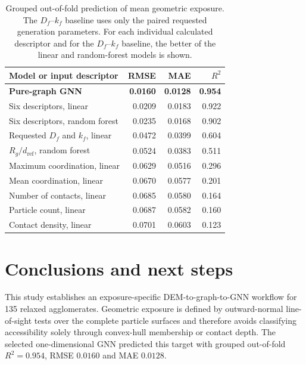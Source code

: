 \documentclass[12pt,a4paper]{article}
\begin{document}
\begin{table}[!tbp]
	\centering
	\caption{Grouped out-of-fold prediction of mean geometric exposure. The
		$D_f$--$k_f$ baseline uses only the paired requested generation parameters.
		For each individual calculated descriptor and for the $D_f$--$k_f$
		baseline, the better of the linear and random-forest models is shown.}
	\label{tab:descriptor_baseline}
	\begin{tabular}{lrrr}
		\toprule
		Model or input descriptor & RMSE & MAE & $R^2$ \\
		\midrule
		\textbf{Pure-graph GNN}
		& \textbf{0.0160} & \textbf{0.0128} & \textbf{0.954} \\
		Six descriptors, linear
		& 0.0209 & 0.0183 & 0.922 \\
		Six descriptors, random forest
		& 0.0235 & 0.0168 & 0.902 \\
		Requested $D_f$ and $k_f$, linear
		& 0.0472 & 0.0399 & 0.604 \\
		$R_g/d_{\mathrm{ref}}$, random forest
		& 0.0524 & 0.0383 & 0.511 \\
		Maximum coordination, linear
		& 0.0629 & 0.0516 & 0.296 \\
		Mean coordination, linear
		& 0.0670 & 0.0577 & 0.201 \\
		Number of contacts, linear
		& 0.0685 & 0.0580 & 0.164 \\
		Particle count, linear
		& 0.0687 & 0.0582 & 0.160 \\
		Contact density, linear
		& 0.0701 & 0.0603 & 0.123 \\
		\bottomrule
	\end{tabular}
\end{table}

\section{Conclusions and next steps}
\label{sec:conclusions}

This study establishes an exposure-specific DEM-to-graph-to-GNN workflow for
135 relaxed agglomerates. Geometric exposure is defined by outward-normal
line-of-sight tests over the complete particle surfaces and therefore avoids
classifying accessibility solely through convex-hull membership or contact
depth. The selected one-dimensional GNN predicted this target with grouped
out-of-fold $R^2=0.954$, RMSE $0.0160$ and MAE $0.0128$.
\end{document}
